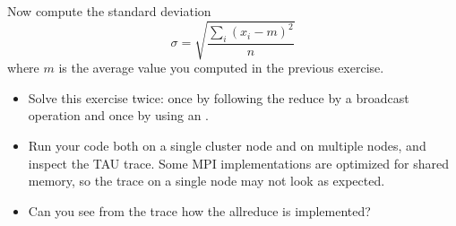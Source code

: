   Now compute the standard deviation
  \[ \sigma = \sqrt{\frac{ \sum_i (x_i-m)^2 }{n} } \]
  where $m$ is the average value you computed in the previous exercise.
  \begin{itemize}
  \item Solve this exercise twice: once by following the reduce by a
    broadcast operation and once by using an .
  \item Run your code both on a single cluster node and on multiple
    nodes, and inspect the TAU trace. Some MPI implementations are
    optimized for shared memory, so the trace on a single node may not
    look as expected.
  \item Can you see from the trace how the allreduce is implemented?
  \end{itemize}
